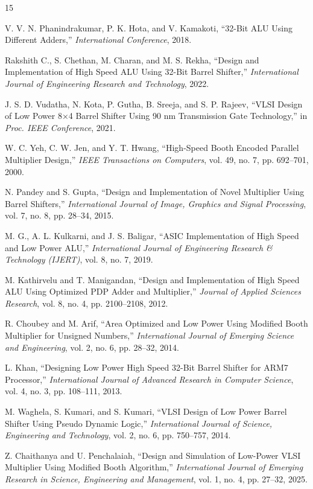 \documentclass[conference]{IEEEtran}
\begin{document}
\begin{thebibliography}{15}

V. V. N. Phanindrakumar, P. K. Hota, and V. Kamakoti, ``32-Bit ALU Using Different Adders,'' \emph{International Conference}, 2018.

Rakshith C., S. Chethan, M. Charan, and M. S. Rekha, ``Design and Implementation of High Speed ALU Using 32-Bit Barrel Shifter,'' \emph{International Journal of Engineering Research and Technology}, 2022.

J. S. D. Vudatha, N. Kota, P. Gutha, B. Sreeja, and S. P. Rajeev, ``VLSI Design of Low Power 8×4 Barrel Shifter Using 90 nm Transmission Gate Technology,'' in \emph{Proc. IEEE Conference}, 2021.

W. C. Yeh, C. W. Jen, and Y. T. Hwang, ``High-Speed Booth Encoded Parallel Multiplier Design,'' \emph{IEEE Transactions on Computers}, vol. 49, no. 7, pp. 692--701, 2000.

N. Pandey and S. Gupta, ``Design and Implementation of Novel Multiplier Using Barrel Shifters,'' \emph{International Journal of Image, Graphics and Signal Processing}, vol. 7, no. 8, pp. 28--34, 2015. 

M. G., A. L. Kulkarni, and J. S. Baligar, ``ASIC Implementation of High Speed and Low Power ALU,'' \emph{International Journal of Engineering Research \& Technology (IJERT)}, vol. 8, no. 7, 2019. 

M. Kathirvelu and T. Manigandan, ``Design and Implementation of High Speed ALU Using Optimized PDP Adder and Multiplier,'' \emph{Journal of Applied Sciences Research}, vol. 8, no. 4, pp. 2100--2108, 2012. 

R. Choubey and M. Arif, ``Area Optimized and Low Power Using Modified Booth Multiplier for Unsigned Numbers,'' \emph{International Journal of Emerging Science and Engineering}, vol. 2, no. 6, pp. 28--32, 2014. 

L. Khan, ``Designing Low Power High Speed 32-Bit Barrel Shifter for ARM7 Processor,'' \emph{International Journal of Advanced Research in Computer Science}, vol. 4, no. 3, pp. 108--111, 2013.

M. Waghela, S. Kumari, and S. Kumari, ``VLSI Design of Low Power Barrel Shifter Using Pseudo Dynamic Logic,'' \emph{International Journal of Science, Engineering and Technology}, vol. 2, no. 6, pp. 750--757, 2014. 

Z. Chaithanya and U. Penchalaiah, ``Design and Simulation of Low-Power VLSI Multiplier Using Modified Booth Algorithm,'' \emph{International Journal of Emerging Research in Science, Engineering and Management}, vol. 1, no. 4, pp. 27--32, 2025.


\end{thebibliography}
\end{document}
